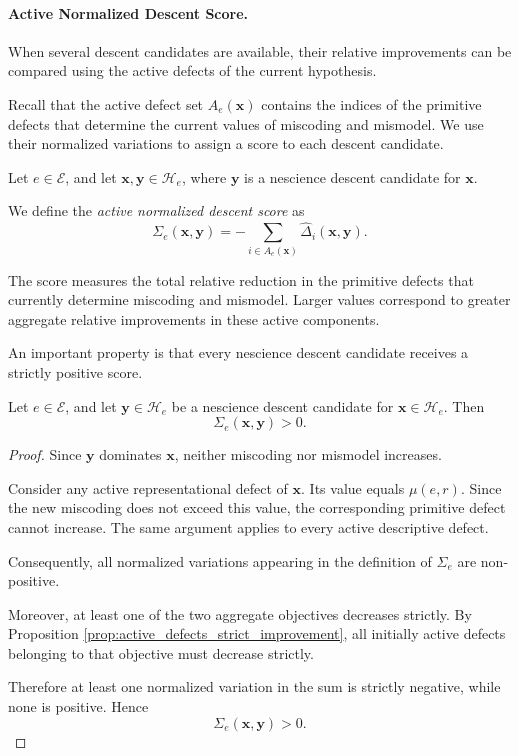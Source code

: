 \paragraph{Active Normalized Descent Score.}

When several descent candidates are available, their
relative improvements can be compared using the active
defects of the current hypothesis.

Recall that the active defect set $A_e(\mathbf{x})$
contains the indices of the primitive defects that
determine the current values of miscoding and mismodel.
We use their normalized variations to assign a score
to each descent candidate.

\begin{definition}
Let $e\in\mathcal E$, and let
$\mathbf{x},\mathbf{y}\in\mathcal H_e$,
where $\mathbf{y}$ is a nescience descent candidate
for $\mathbf{x}$.

We define the \emph{active normalized descent score}
 as
\[
\Sigma_e(\mathbf{x},\mathbf{y})
=
-\sum_{i\in A_e(\mathbf{x})}
\widehat{\Delta}_i(\mathbf{x},\mathbf{y}).
\]
\end{definition}

The score measures the total relative reduction in
the primitive defects that currently determine
miscoding and mismodel. Larger values correspond
to greater aggregate relative improvements in these
active components.

An important property is that every nescience descent
candidate receives a strictly positive score.

\begin{proposition}
\label{prop:score_positive}
Let $e\in\mathcal E$, and let
$\mathbf{y}\in\mathcal H_e$ be a nescience descent
candidate for $\mathbf{x}\in\mathcal H_e$.
Then
\[
\Sigma_e(\mathbf{x},\mathbf{y})>0.
\]
\end{proposition}

\begin{proof}
Since $\mathbf{y}$ dominates $\mathbf{x}$,
neither miscoding nor mismodel increases.

Consider any active representational defect of
$\mathbf{x}$. Its value equals $\mu(e,r)$.
Since the new miscoding does not exceed this value,
the corresponding primitive defect cannot increase.
The same argument applies to every active
descriptive defect.

Consequently, all normalized variations appearing
in the definition of $\Sigma_e$ are non-positive.

Moreover, at least one of the two aggregate objectives
decreases strictly. By Proposition
\ref{prop:active_defects_strict_improvement},
all initially active defects belonging to that
objective must decrease strictly.

Therefore at least one normalized variation in
the sum is strictly negative, while none is positive.
Hence
\[
\Sigma_e(\mathbf{x},\mathbf{y})>0.
\]
\end{proof}

